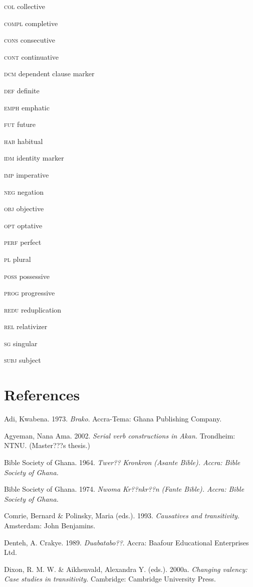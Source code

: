 \documentclass[output=paper]{langsci/langscibook}
\begin{document}
\textsc{col}   collective

\textsc{compl}  completive

\textsc{cons}  consecutive

\textsc{cont}  continuative

\textsc{dcm}   dependent clause marker

\textsc{def}   definite

\textsc{emph}  emphatic

\textsc{fut}  future

\textsc{hab}  habitual

\textsc{idm}  identity marker

\textsc{imp}  imperative

\textsc{neg}  negation

\textsc{obj}  objective

\textsc{opt}  optative

\textsc{perf}  perfect

\textsc{pl}  plural

\textsc{poss}  possessive

\textsc{prog}  progressive

\textsc{redu}  reduplication

\textsc{rel  }relativizer

\textsc{sg  }singular

\textsc{subj  }subject

\section{References}

Adi, Kwabena. 1973. \emph{Brako}. Accra-Tema: Ghana Publishing Company.

Agyeman, Nana Ama. 2002. \emph{Serial verb constructions in Akan.} Trondheim: NTNU. (Master???s thesis.)

Bible Society of Ghana. 1964. \emph{Twer?? Kronkron}\emph{\textup{ (}}\emph{Asante Bible}\emph{\textup{). Accra: Bible Society of Ghana.}}

Bible Society of Ghana. 1974. \emph{Nwoma Kr??nkr??n}\emph{\textup{ (}}\emph{Fante Bible}\emph{\textup{). Accra: Bible Society of Ghana.}}

Comrie, Bernard \& Polinsky, Maria (eds.). 1993. \textit{Causatives and transitivity.} Amsterdam: John Benjamins.

Denteh, A. Crakye. 1989. \emph{Duabatabo??}. Accra: Baafour Educational Enterprises Ltd.

Dixon, R. M. W. \& Aikhenvald, Alexandra Y. (eds.). 2000a. \textit{Changing valency: Case studies in transitivity.} Cambridge: Cambridge University Press.
\end{document}
